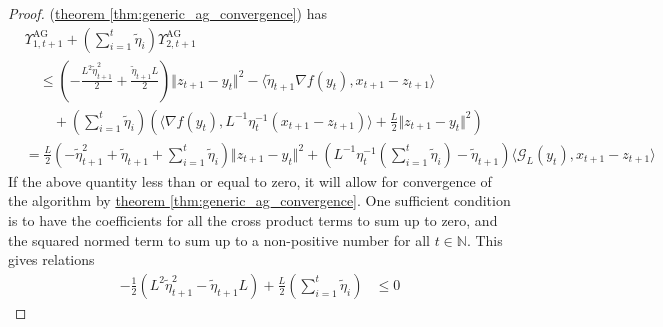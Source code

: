 \documentclass[12pt]{article}
\begin{document}
\begin{proof}
            (\hyperref[thm:generic_ag_convergence]{theorem \ref*{thm:generic_ag_convergence}}) 
            has 
            {\footnotesize
            \begin{align*}
                & \Upsilon_{1, t + 1}^{\text{AG}} + 
                \left(
                    \sum_{i = 1}^{t}\tilde \eta_i
                \right)\Upsilon_{2, t + 1}^{\text{AG}}
                \\
                &\quad \le 
                \left(
                    - \frac{L^2\tilde \eta_{t + 1}^2}{2}
                    + \frac{\tilde\eta_{t+1}L}{2}
                \right)
                \Vert z_{t+1} - y_t\Vert^2
                - 
                \langle \tilde \eta_{t+1} \nabla f(y_t), x_{t+1} - z_{t + 1}\rangle
                \\
                & \qquad + 
                \left(
                    \sum_{i = 1}^{t}\tilde \eta_i
                \right)\left(
                    \langle \nabla f(y_t), L^{-1}\eta_t^{-1}(x_{t+1} - z_{t + 1})\rangle
                    + \frac{L}{2}\Vert z_{t + 1} - y_t\Vert^2
                \right)
                \\
                &= 
                \frac{L}{2}
                \left(
                -\tilde\eta_{t + 1}^2 + \tilde\eta_{t + 1}
                    + \sum_{i = 1}^{t}\tilde\eta_i
                \right)\Vert z_{t + 1} - y_t\Vert^2
                +
                \left(
                    L^{-1}\eta_t^{-1} 
                    \left(
                        \sum_{i = 1}^{t}\tilde \eta_i
                    \right)
                    -
                    \tilde \eta_{t + 1}
                \right)\langle \mathcal G_L (y_t), x_{t + 1} - z_{t + 1}\rangle
            \end{align*}
            }
            If the above quantity less than or equal to zero, it will allow for convergence of the algorithm by 
            \hyperref[thm:generic_ag_convergence]{theorem \ref*{thm:generic_ag_convergence}}.
            One sufficient condition is to have the coefficients for all the cross product terms to sum up to zero, and the squared normed term to sum up to a non-positive number for all $t \in \mathbb N$. 
            This gives relations 
            \begin{align*}
                - \frac{1}{2}\left(
                    L^2 \tilde\eta_{t+1}^2 - \tilde\eta_{t+1}L 
                \right) + 
                \frac{L}{2}\left(
                    \sum_{i = 1}^{t} \tilde \eta_i
                \right) &\le 0

\end{align*}
\end{proof}
\end{document}
